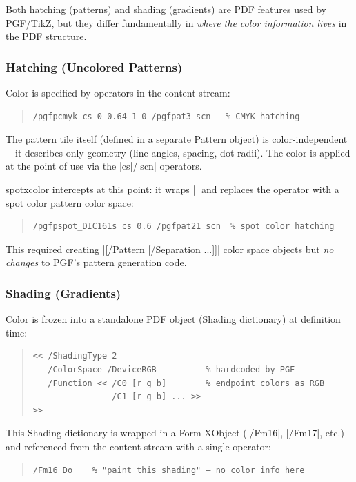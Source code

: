 \documentclass[luatex]{article}
\newcommand\pkg[1]{\textsf{#1}}
\begin{document}
Both hatching (patterns) and shading (gradients) are PDF features used by PGF/TikZ, but they differ fundamentally in \emph{where the color information lives} in the PDF structure.

\subsubsection{Hatching (Uncolored Patterns)}

Color is specified by operators in the content stream:
\begin{quote}
\begin{verbatim}
/pgfpcmyk cs 0 0.64 1 0 /pgfpat3 scn   % CMYK hatching
\end{verbatim}
\end{quote}

The pattern tile itself (defined in a separate Pattern object) is color-independent---it describes only geometry (line angles, spacing, dot radii).
The color is applied at the point of use via the |cs|/|scn| operators.

\pkg{spotxcolor} intercepts at this point: it wraps |\pgfsys@setpatternuncolored| and replaces the operator with a spot color pattern color space:
\begin{quote}
\begin{verbatim}
/pgfpspot_DIC161s cs 0.6 /pgfpat21 scn  % spot color hatching
\end{verbatim}
\end{quote}

This required creating |[/Pattern [/Separation ...]]| color space objects but \emph{no changes} to PGF's pattern generation code.

\subsubsection{Shading (Gradients)}

Color is frozen into a standalone PDF object (Shading dictionary) at definition time:
\begin{quote}
\begin{verbatim}
<< /ShadingType 2
   /ColorSpace /DeviceRGB          % hardcoded by PGF
   /Function << /C0 [r g b]        % endpoint colors as RGB
                /C1 [r g b] ... >>
>>
\end{verbatim}
\end{quote}

This Shading dictionary is wrapped in a Form XObject (|/Fm16|, |/Fm17|, etc.) and referenced from the content stream with a single operator:
\begin{quote}
\begin{verbatim}
/Fm16 Do    % "paint this shading" — no color info here
\end{verbatim}
\end{quote}
\end{document}
